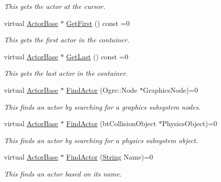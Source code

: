 \begin{DoxyCompactItemize}
\begin{DoxyCompactList}\small\item\em This gets the actor at the cursor. \item\end{DoxyCompactList}\item 
virtual \hyperlink{classphys_1_1ActorBase}{ActorBase} $\ast$ \hyperlink{classphys_1_1ActorContainerBase_ae703482d84a9c6726e28a8f26418b161}{GetFirst} () const =0
\begin{DoxyCompactList}\small\item\em This gets the first actor in the container. \item\end{DoxyCompactList}\item 
virtual \hyperlink{classphys_1_1ActorBase}{ActorBase} $\ast$ \hyperlink{classphys_1_1ActorContainerBase_a8efeffd5ae22085fe01af791b3ea559e}{GetLast} () const =0
\begin{DoxyCompactList}\small\item\em This gets the last actor in the container. \item\end{DoxyCompactList}\item 
virtual \hyperlink{classphys_1_1ActorBase}{ActorBase} $\ast$ \hyperlink{classphys_1_1ActorContainerBase_a2e4652bf92f24a0ff20bdc4a7173b567}{FindActor} (Ogre::Node $\ast$GraphicsNode)=0
\begin{DoxyCompactList}\small\item\em This finds an actor by searching for a graphics subsystem nodes. \item\end{DoxyCompactList}\item 
virtual \hyperlink{classphys_1_1ActorBase}{ActorBase} $\ast$ \hyperlink{classphys_1_1ActorContainerBase_a9ba6e38e0f12ada968cfee72fe5144d4}{FindActor} (btCollisionObject $\ast$PhysicsObject)=0
\begin{DoxyCompactList}\small\item\em This finds an actor by searching for a physics subsystem object. \item\end{DoxyCompactList}\item 
virtual \hyperlink{classphys_1_1ActorBase}{ActorBase} $\ast$ \hyperlink{classphys_1_1ActorContainerBase_a91223cbaebb8e5f11a4f971d7e5b64b6}{FindActor} (\hyperlink{namespacephys_aa03900411993de7fbfec4789bc1d392e}{String} Name)=0
\begin{DoxyCompactList}\small\item\em This finds an actor based on its name. \item\end{DoxyCompactList}\item 

\end{DoxyCompactItemize}
